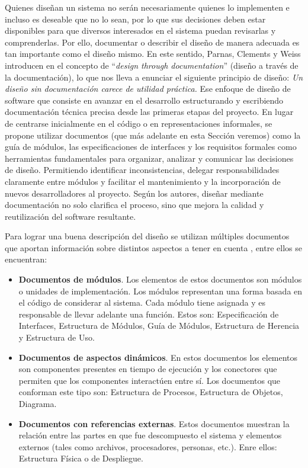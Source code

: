 Quienes diseñan un sistema no serán necesariamente quienes lo implementen e incluso es deseable que no lo sean, por lo que sus decisiones deben estar disponibles para que diversos interesados en el sistema puedan revisarlas y comprenderlas. Por ello, documentar o describir el diseño de manera adecuada es tan importante como el diseño mismo. En este sentido, Parnas, Clements y Weiss introducen en el concepto de ``\textit{design through documentation}'' (diseño a través de la documentación), lo que nos lleva a enunciar el siguiente principio de diseño: \textit{Un diseño sin documentación carece de utilidad práctica.} Ese enfoque de diseño de software que consiste en avanzar en el desarrollo estructurando y escribiendo documentación técnica precisa desde las primeras etapas del proyecto. En lugar de centrarse inicialmente en el código o en representaciones informales, se propone utilizar documentos (que más adelante en esta Sección veremos) como la guía de módulos, las especificaciones de interfaces y los requisitos formales como herramientas fundamentales para organizar, analizar y comunicar las decisiones de diseño. Permitiendo identificar inconsistencias, delegar responsabilidades claramente entre módulos y facilitar el mantenimiento y la incorporación de nuevos desarrolladores al proyecto. Según los autores, diseñar mediante documentación no solo clarifica el proceso, sino que mejora la calidad y reutilización del software resultante.

Para lograr una buena descripción del diseño se utilizan múltiples documentos que aportan información sobre distintos aspectos a tener en cuenta \cite{ClementsEtAl2010}, entre ellos se encuentran:

\begin{itemize}
\item \textbf{Documentos de módulos}. Los elementos de estos documentos son módulos o unidades de implementación. Los módulos representan una forma basada en el código de considerar al sistema. Cada módulo tiene asignada y es responsable de llevar adelante una función. Estos son: Especificación de Interfaces, Estructura de Módulos, Guía de Módulos, Estructura de Herencia y Estructura de Uso.
\item \textbf{Documentos de aspectos dinámicos}. En estos documentos los elementos son componentes presentes en tiempo de ejecución y los conectores que permiten que los componentes interactúen entre sí. Los documentos que conforman este tipo son: Estructura de Procesos, Estructura de Objetos, Diagrama.
\item \textbf{Documentos con referencias externas}. Estos documentos muestran la relación entre las partes en que fue descompuesto el sistema y elementos externos (tales como archivos, procesadores, personas, etc.). Enre ellos: Estructura Física o de Despliegue.
\end{itemize}

